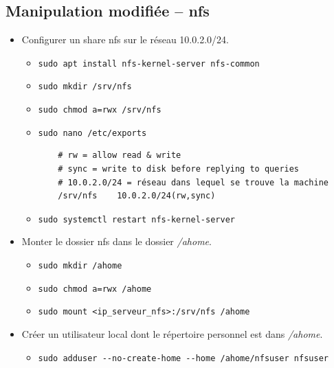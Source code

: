 \documentclass[a4paper]{article}
\begin{document}
\subsection{Manipulation modifiée -- nfs}





\begin{itemize}

\item Configurer un share nfs sur le réseau 10.0.2.0/24.
\begin{example}
    \begin{itemize}
        \item \texttt{sudo apt install nfs-kernel-server nfs-common}
        \item \texttt{sudo mkdir /srv/nfs}
        \item \texttt{sudo chmod a=rwx /srv/nfs}
        \item \texttt{sudo nano /etc/exports}
        \begin{verbatim}
    # rw = allow read & write
    # sync = write to disk before replying to queries
    # 10.0.2.0/24 = réseau dans lequel se trouve la machine
    /srv/nfs    10.0.2.0/24(rw,sync)
        \end{verbatim}
        \item \texttt{sudo systemctl restart nfs-kernel-server}
    \end{itemize}
\end{example}

\item Monter le dossier nfs dans le dossier \textit{/ahome}.
\begin{example}
    \begin{itemize}
        \item \texttt{sudo mkdir /ahome}
        \item \texttt{sudo chmod a=rwx /ahome}
        \item \texttt{sudo mount <ip\_serveur\_nfs>:/srv/nfs /ahome}
    \end{itemize}
\end{example}

\item Créer un utilisateur local dont le répertoire personnel est dans \textit{/ahome}.
\begin{example}
    \begin{itemize}
        \item \texttt{sudo adduser -{}-no-create-home -{}-home /ahome/nfsuser nfsuser}
    \end{itemize}
\end{example}


\end{itemize}
\end{document}
